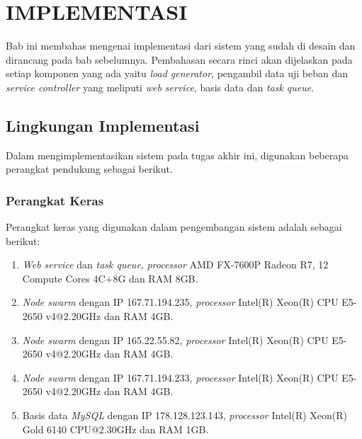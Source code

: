 \chapter{IMPLEMENTASI}
	Bab ini membahas mengenai implementasi dari sistem yang sudah di desain dan dirancang pada bab sebelumnya. Pembahasan secara rinci akan dijelaskan pada setiap komponen yang ada yaitu \textit{load generator}, pengambil data uji beban dan \textit{service controller} yang meliputi \textit{web service}, basis data dan \textit{task queue}.
	
	\section{Lingkungan Implementasi}
		Dalam mengimplementasikan sistem pada tugas akhir ini, digunakan beberapa perangkat pendukung sebagai berikut.
		
		\subsection{Perangkat Keras}
		Perangkat keras yang digunakan dalam pengembangan sistem adalah sebagai berikut:
		\begin{enumerate}
			\item \textit{Web service} dan \textit{task queue}, \textit{processor} AMD FX-7600P Radeon R7, 12 Compute Cores 4C+8G dan RAM 8GB.
			\item \textit{Node swarm} dengan IP 167.71.194.235, \textit{processor} Intel(R) Xeon(R) CPU E5-2650 v4@2.20GHz dan RAM 4GB.
			\item \textit{Node swarm} dengan IP 165.22.55.82, \textit{processor} Intel(R) Xeon(R) CPU E5-2650 v4@2.20GHz dan RAM 4GB.
			\item \textit{Node swarm} dengan IP 167.71.194.233, \textit{processor} Intel(R) Xeon(R) CPU E5-2650 v4@2.20GHz dan RAM 4GB.
			\item Basis data \textit{MySQL} dengan IP 178.128.123.143, \textit{processor} Intel(R) Xeon(R) Gold 6140 CPU@2.30GHz dan RAM 1GB.
		\end{enumerate}
	
